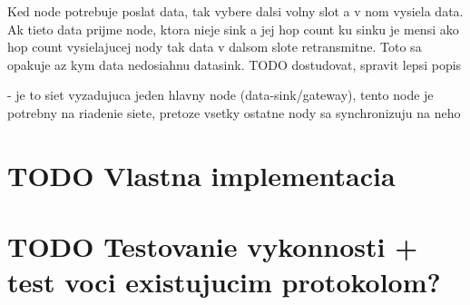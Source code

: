 \documentclass[slovak,master]{diploma}
\begin{document}
Ked node potrebuje poslat data, tak vybere dalsi volny slot a v nom vysiela data. Ak tieto data prijme node, ktora nieje sink a jej hop count ku sinku je mensi ako hop count
vysielajucej nody tak data v dalsom slote retransmitne. Toto sa opakuje az kym data nedosiahnu datasink. TODO dostudovat, spravit lepsi popis

- je to siet vyzadujuca jeden hlavny node (data-sink/gateway), tento node je potrebny na riadenie siete, pretoze vsetky ostatne nody sa synchronizuju na neho



\chapter{TODO Vlastna implementacia}
\chapter{TODO Testovanie vykonnosti + test voci existujucim protokolom?}


\printbibliography[title={Literatura}, heading=bibintoc]

%
%

%
\end{document}
